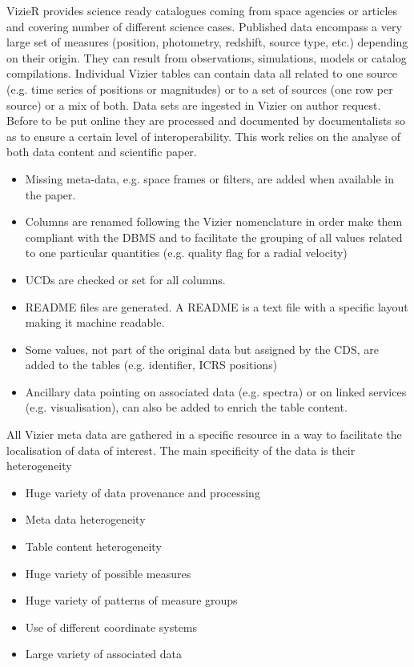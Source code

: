 %
VizieR provides science ready catalogues coming from space agencies or articles and covering number of different science cases.
Published data encompass a very large set of measures (position, photometry, redshift, source type, etc.) depending on their origin.
They can result from  observations, simulations, models or catalog compilations.
Individual Vizier tables can contain data all related to one source (e.g. time series of positions or magnitudes) or to a set of sources (one row per source) or a mix of both.
%
Data sets are ingested in Vizier on author request. Before to be put online they are processed and documented by documentalists so as to ensure a certain level of interoperability.
This work relies on the analyse of both data content and scientific paper.
\begin{itemize}
\item Missing meta-data, e.g. space frames or filters, are added when available in the paper.
\item Columns are renamed following the Vizier nomenclature in order make them compliant with the DBMS and to facilitate the grouping of all values related to one particular quantities (e.g. quality flag for a radial velocity)
\item UCDs are checked or set for all columns.
\item README files are generated. A README is a text file with a specific layout making it machine readable.
\item Some values, not part of the original data but assigned by the CDS, are added to the tables (e.g. identifier, ICRS positions)
\item Ancillary data pointing on associated data (e.g.  spectra) or on linked services (e.g. visualisation), can also be added to enrich the table content.
\end{itemize}

All Vizier meta data are gathered in a specific resource in a way to facilitate the localisation of data of interest.
The main specificity of the data is their heterogeneity
\begin{itemize}
\item Huge variety of data provenance and processing
\item Meta data heterogeneity
\item Table content heterogeneity
\item Huge variety of possible measures
\item Huge variety of patterns of measure groups
\item Use of different coordinate systems
\item Large variety of associated data
\end{itemize}

